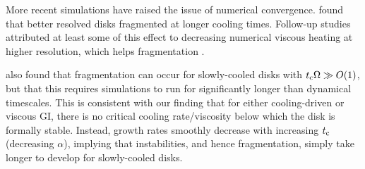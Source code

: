 



More recent simulations have raised the issue of numerical
convergence. %
\cite{meru11} found that better resolved disks fragmented at longer cooling times.
Follow-up studies attributed at least some of this effect to decreasing numerical viscous
heating at higher resolution, which helps fragmentation
\citep{lodato11,meru12}.

 \cite{paardekooper12} also found that fragmentation can occur 
for  slowly-cooled disks with $t_\mathrm{c}\Omega\gg O(1)$, but that this requires   
simulations to run for significantly longer than dynamical 
timescales. This is consistent with our finding
that for either cooling-driven or viscous GI, there is no critical 
cooling rate/viscosity below  which the disk is  
formally stable. Instead, growth rates smoothly decrease with
increasing $t_\mathrm{c}$ (decreasing $\alpha$), implying that
instabilities, and hence fragmentation, simply take longer to develop
for slowly-cooled disks.         


